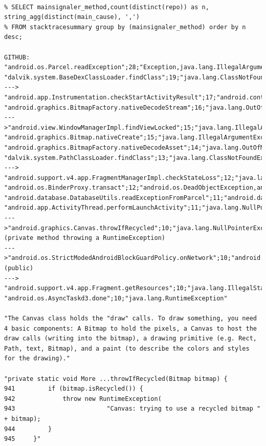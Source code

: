 \documentclass[conference]{IEEEtran}
\begin{document}
{\tiny
\begin{verbatim}

% SELECT mainsignaler_method,count(distinct(repo)) as n, string_agg(distinct(main_cause), ',')
% FROM stacktracesummary group by (mainsignaler_method) order by n desc;

GITHUB:
"android.os.Parcel.readException";28;"Exception,java.lang.IllegalArgumentException,java.lang.IllegalStateException,java.lang.NullPointerException,java.lang.SecurityException"
"dalvik.system.BaseDexClassLoader.findClass";19;"java.lang.ClassNotFoundException"
---> "android.app.Instrumentation.checkStartActivityResult";17;"android.content.ActivityNotFoundException"
"android.graphics.BitmapFactory.nativeDecodeStream";16;"java.lang.OutOfMemoryError"
--->"android.view.WindowManagerImpl.findViewLocked";15;"java.lang.IllegalArgumentException"
"android.graphics.Bitmap.nativeCreate";15;"java.lang.IllegalArgumentException,java.lang.OutOfMemoryError"
"android.graphics.BitmapFactory.nativeDecodeAsset";14;"java.lang.OutOfMemoryError,java.lang.RuntimeException"
"dalvik.system.PathClassLoader.findClass";13;"java.lang.ClassNotFoundException"
---> "android.support.v4.app.FragmentManagerImpl.checkStateLoss";12;"java.lang.IllegalStateException"
"android.os.BinderProxy.transact";12;"android.os.DeadObjectException,android.os.TransactionTooLargeException,java.lang.RuntimeException"
"android.database.DatabaseUtils.readExceptionFromParcel";11;"android.database.sqlite.SQLiteDiskIOException,android.database.sqlite.SQLiteException,java.lang.IllegalArgumentException"
"android.app.ActivityThread.performLaunchActivity";11;"java.lang.NullPointerException,java.lang.RuntimeException"
--->"android.graphics.Canvas.throwIfRecycled";10;"java.lang.NullPointerException,java.lang.RuntimeException" (private method throwing a RuntimeException)
--->"android.os.StrictModedAndroidBlockGuardPolicy.onNetwork";10;"android.os.NetworkOnMainThreadException" (public)
---> "android.support.v4.app.Fragment.getResources";10;"java.lang.IllegalStateException"
"android.os.AsyncTaskd3.done";10;"java.lang.RuntimeException"

"The Canvas class holds the "draw" calls. To draw something, you need 4 basic components: A Bitmap to hold the pixels, a Canvas to host the draw calls (writing into the bitmap), a drawing primitive (e.g. Rect, Path, text, Bitmap), and a paint (to describe the colors and styles for the drawing)."

"private static void More ...throwIfRecycled(Bitmap bitmap) {
941         if (bitmap.isRecycled()) {
942             throw new RuntimeException(
943                         "Canvas: trying to use a recycled bitmap " + bitmap);
944         }
945     }"



\end{verbatim}}
\end{document}
